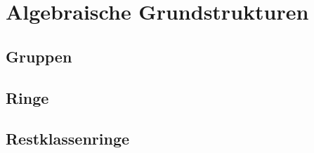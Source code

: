 \section{Algebraische Grundstrukturen}

\subsection{Gruppen}

\subsection{Ringe}

\subsection{Restklassenringe}